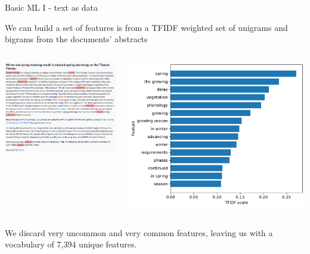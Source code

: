 \documentclass[9pt]{beamer}
\begin{document}
\begin{frame}{Basic ML I - text as data}

We can build a set of features is from a TFIDF weighted set of unigrams and bigrams from the documents' abstracts

\medskip

\begin{columns}
	\begin{column}{0.5\linewidth}
		\includegraphics[width=\linewidth]{images/doc_example.png}
	\end{column}
	\begin{column}{0.5\linewidth}
		\includegraphics[width=\linewidth]{images/example_doc_tfidf.pdf}
	\end{column}
\end{columns}

\medskip

We discard very uncommon and very common features, leaving us with a vocabulary of 7,394 unique features.

\end{frame}
\end{document}
